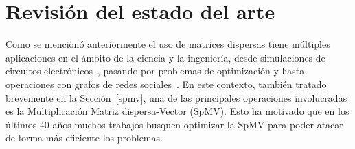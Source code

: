    \chapter{Revisión del estado del arte}\label{ch:estado-del-arte}










Como se mencionó anteriormente el uso de matrices dispersas tiene múltiples aplicaciones en el ámbito de la ciencia y la ingeniería, desde simulaciones de circuitos electrónicos~\cite{Davis2010Algorithm9K}, pasando por problemas de optimización y hasta operaciones con grafos de redes sociales~\cite{Chakraborty2018}. En este contexto, también tratado brevemente en la Sección~\ref{spmv}, una de las principales operaciones involucradas es la Multiplicación Matriz dispersa-Vector (SpMV). Esto ha motivado que en los últimos 40 años muchos trabajos busquen optimizar la SpMV para poder atacar de forma más eficiente los problemas. 

